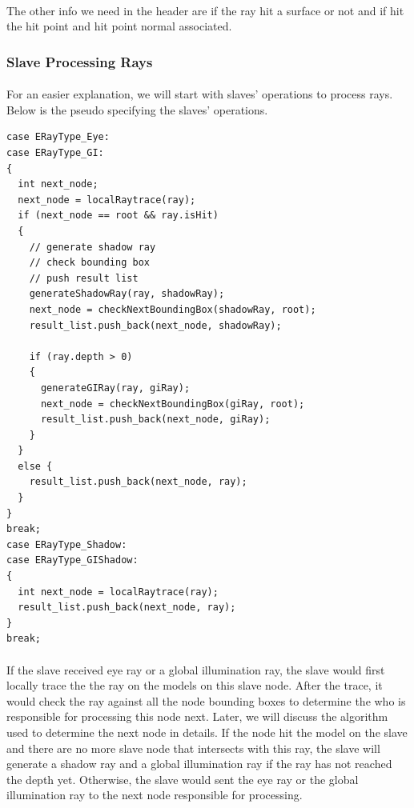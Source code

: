 \documentclass[a4paper, oneside, 10pt]{article}
\begin{document}
\paragraph{} The other info we need in the header are if the ray hit a surface or not and if hit the hit point and hit point normal associated.\\ 
\subsubsection{Slave Processing Rays}
\paragraph{} For an easier explanation, we will start with slaves' operations to process rays.  Below is the pseudo specifying the slaves' operations.
\begin{lstlisting}[frame=single] 
case ERayType_Eye:
case ERayType_GI:
{
  int next_node;
  next_node = localRaytrace(ray);
  if (next_node == root && ray.isHit)
  {
    // generate shadow ray
    // check bounding box
    // push result list
    generateShadowRay(ray, shadowRay);
    next_node = checkNextBoundingBox(shadowRay, root);
    result_list.push_back(next_node, shadowRay);

    if (ray.depth > 0)
    {
      generateGIRay(ray, giRay);
      next_node = checkNextBoundingBox(giRay, root);
      result_list.push_back(next_node, giRay);
    }
  }
  else {
    result_list.push_back(next_node, ray);
  }
}
break;
case ERayType_Shadow:
case ERayType_GIShadow:
{
  int next_node = localRaytrace(ray);
  result_list.push_back(next_node, ray);
}
break;
\end{lstlisting}

\paragraph{} If the slave received eye ray or a global illumination ray, the slave would first locally trace the the ray on the models on this slave node. After the trace, it would check the ray against all the node bounding boxes to determine the who is responsible for processing this node next. Later, we will discuss the algorithm used to determine the next node in details.  If the node hit the model on the slave and there are no more slave node that intersects with this ray, the slave will generate a shadow ray and a global illumination ray if the ray has not reached the depth yet. Otherwise, the slave would sent the eye ray or the global illumination ray to the next node responsible for processing.
\end{document}
